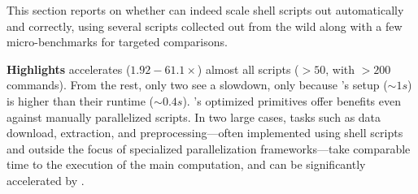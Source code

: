 \documentclass[letterpaper,twocolumn,10pt]{article}
\newcommand{\heading}[1]{\vspace{4pt}\noindent\textbf{#1}\enspace}
\newcommand{\TODO}[1]{\hl{\textbf{TODO:} #1}\xspace}
\newcommand{\kk}[1]{[{\color{magenta}kk: #1}]}
\begin{document}




This section reports on whether \sys can indeed scale shell scripts out automatically and correctly, using several scripts collected out from the wild along with a few micro-benchmarks for targeted comparisons.


\heading{Highlights}
\sys accelerates ($1.92-61.1\times$) almost all scripts ($>50$, with $>200$ commands).
From the rest, only two see a slowdown, only because \sys's setup ($\sim1s$) is higher than their runtime ($\sim0.4s$).
\sys's optimized primitives offer benefits even against manually parallelized scripts. %
In two large cases, tasks such as data download, extraction, and preprocessing---often implemented using shell scripts and outside the focus of specialized parallelization frameworks---take comparable time to the execution of the main computation, and can be significantly accelerated by \sys.
\end{document}
